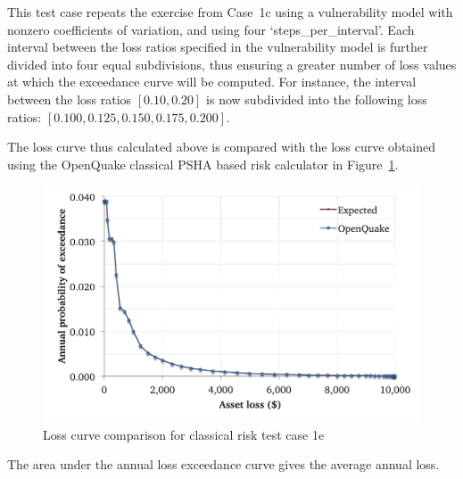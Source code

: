 This test case repeats the exercise from Case~1c using a vulnerability model with nonzero coefficients of variation, and using four `steps\_per\_interval'. Each interval between the loss ratios specified in the vulnerability model is further divided into four equal subdivisions, thus ensuring a greater number of loss values at which the exceedance curve will be computed. For instance, the interval between the loss ratios $[0.10, 0.20]$ is now subdivided into the following loss ratios: $[0.100, 0.125, 0.150, 0.175, 0.200]$.

The loss curve thus calculated above is compared with the loss curve obtained using the OpenQuake classical PSHA based risk calculator in Figure~\ref{fig:lc-cr-1e}.

\begin{figure}[htbp]
\centering
\includegraphics[width=12cm]{qareport/figures/fig-lc-cr-1e}
\caption{Loss curve comparison for classical risk test case 1e}
\label{fig:lc-cr-1e}
\end{figure}

The area under the annual loss exceedance curve gives the average annual loss.